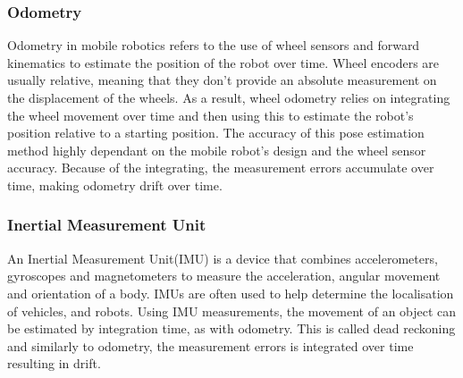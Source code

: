 
\subsubsection{Odometry}
Odometry in mobile robotics refers to the use of wheel sensors and forward kinematics to estimate the position of the robot over time. Wheel encoders are usually relative, meaning that they don't provide an absolute measurement on the displacement of the wheels. As a result, wheel odometry relies on integrating the wheel movement over time and then using this to estimate the robot's position relative to a starting position. The accuracy of this pose estimation method highly dependant on the mobile robot's design and the wheel sensor accuracy. Because of the integrating, the measurement errors accumulate over time, making odometry drift over time.

\subsubsection{Inertial Measurement Unit}
An Inertial Measurement Unit(IMU) is a device that combines accelerometers, gyroscopes and magnetometers to measure the acceleration, angular movement and orientation of a body. IMUs are often used to help determine the localisation of vehicles, and robots. Using IMU measurements, the movement of an object can be estimated by integration time, as with odometry. This is called dead reckoning and similarly to odometry, the measurement errors is integrated over time resulting in drift.


